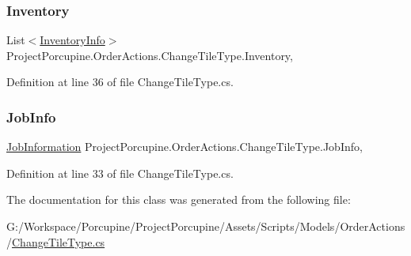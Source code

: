 \subsubsection{\texorpdfstring{Inventory}{Inventory}}
{\footnotesize\ttfamily List$<$\hyperlink{class_project_porcupine_1_1_order_actions_1_1_order_action_1_1_inventory_info}{Inventory\+Info}$>$ Project\+Porcupine.\+Order\+Actions.\+Change\+Tile\+Type.\+Inventory\hspace{0.3cm}{\ttfamily [get]}, {\ttfamily [set]}}



Definition at line 36 of file Change\+Tile\+Type.\+cs.

\mbox{\label{class_project_porcupine_1_1_order_actions_1_1_change_tile_type_a4bf3c3512f1e94f13171d6f8d609c34c}} 
\subsubsection{\texorpdfstring{Job\+Info}{JobInfo}}
{\footnotesize\ttfamily \hyperlink{class_project_porcupine_1_1_order_actions_1_1_order_action_1_1_job_information}{Job\+Information} Project\+Porcupine.\+Order\+Actions.\+Change\+Tile\+Type.\+Job\+Info\hspace{0.3cm}{\ttfamily [get]}, {\ttfamily [set]}}



Definition at line 33 of file Change\+Tile\+Type.\+cs.



The documentation for this class was generated from the following file\+:\begin{DoxyCompactItemize}
\item 
G\+:/\+Workspace/\+Porcupine/\+Project\+Porcupine/\+Assets/\+Scripts/\+Models/\+Order\+Actions/\hyperlink{_change_tile_type_8cs}{Change\+Tile\+Type.\+cs}\end{DoxyCompactItemize}
